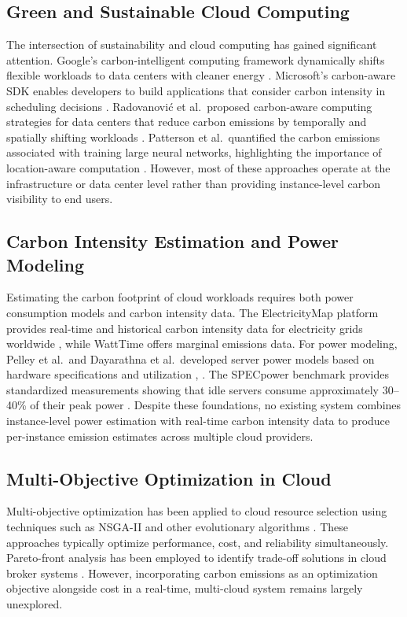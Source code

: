 \documentclass[conference]{IEEEtran}
\begin{document}
\subsection{Green and Sustainable Cloud Computing}

The intersection of sustainability and cloud computing has gained significant attention. Google's carbon-intelligent computing framework dynamically shifts flexible workloads to data centers with cleaner energy \cite{b3}. Microsoft's carbon-aware SDK enables developers to build applications that consider carbon intensity in scheduling decisions \cite{b4}. Radovanovi\'{c} et al.\ proposed carbon-aware computing strategies for data centers that reduce carbon emissions by temporally and spatially shifting workloads \cite{b7}. Patterson et al.\ quantified the carbon emissions associated with training large neural networks, highlighting the importance of location-aware computation \cite{b8}. However, most of these approaches operate at the infrastructure or data center level rather than providing instance-level carbon visibility to end users.

\subsection{Carbon Intensity Estimation and Power Modeling}

Estimating the carbon footprint of cloud workloads requires both power consumption models and carbon intensity data. The ElectricityMap platform provides real-time and historical carbon intensity data for electricity grids worldwide \cite{b9}, while WattTime offers marginal emissions data. For power modeling, Pelley et al.\ and Dayarathna et al.\ developed server power models based on hardware specifications and utilization \cite{b10}, \cite{b11}. The SPECpower benchmark provides standardized measurements showing that idle servers consume approximately 30--40\% of their peak power \cite{b12}. Despite these foundations, no existing system combines instance-level power estimation with real-time carbon intensity data to produce per-instance emission estimates across multiple cloud providers.

\subsection{Multi-Objective Optimization in Cloud}

Multi-objective optimization has been applied to cloud resource selection using techniques such as NSGA-II and other evolutionary algorithms \cite{b13}. These approaches typically optimize performance, cost, and reliability simultaneously. Pareto-front analysis has been employed to identify trade-off solutions in cloud broker systems \cite{b14}. However, incorporating carbon emissions as an optimization objective alongside cost in a real-time, multi-cloud system remains largely unexplored.
\end{document}
